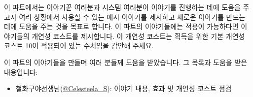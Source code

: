 \documentclass{report}
\begin{document}
	이 파트에서는 이야기꾼 여러분과 시스템 여러분이 이야기를 진행하는 데에 도움을 주고자 여러 상황에서 사용할 수 있는 예시 이야기를 제시하고 새로운 이야기를 만드는 데에 도움을 주는 것을 목표로 합니다. 이 파트의 이야기들에는 적용이 가능하다면 이야기들의 개연성 코스트를 제시합니다. 이 개연성 코스트는 획득을 위한 기본 개연성 코스트 10이 적용되어 있는 수치임을 감안해 주세요.
	
	이 파트의 이야기들을 만들며 여러 분들께 도움을 받았습니다. 그 목록과 도움을 받은 내용입니다:
	\begin{itemize}
		\item 철화구야선생님(\href{https://twitter.com/Celesteela_S}{@Celesteela\_S}): 이야기 내용, 효과 및 개연성 코스트 점검
	\end{itemize}
\end{document}
